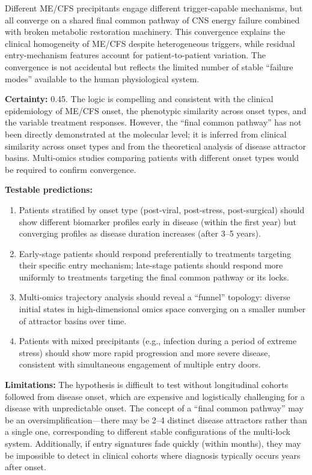 

\begin{hypothesis}
\label{hyp:final-common-pathway}
Different ME/CFS precipitants engage different trigger-capable mechanisms, but all converge on a shared final common pathway of CNS energy failure combined with broken metabolic restoration machinery. This convergence explains the clinical homogeneity of ME/CFS despite heterogeneous triggers, while residual entry-mechanism features account for patient-to-patient variation. The convergence is not accidental but reflects the limited number of stable ``failure modes'' available to the human physiological system.

\textbf{Certainty:} 0.45. The logic is compelling and consistent with the clinical epidemiology of ME/CFS onset, the phenotypic similarity across onset types, and the variable treatment responses. However, the ``final common pathway'' has not been directly demonstrated at the molecular level; it is inferred from clinical similarity across onset types and from the theoretical analysis of disease attractor basins. Multi-omics studies comparing patients with different onset types would be required to confirm convergence.

\textbf{Testable predictions:}
\begin{enumerate}
    \item Patients stratified by onset type (post-viral, post-stress, post-surgical) should show different biomarker profiles early in disease (within the first year) but converging profiles as disease duration increases (after 3--5 years).
    \item Early-stage patients should respond preferentially to treatments targeting their specific entry mechanism; late-stage patients should respond more uniformly to treatments targeting the final common pathway or its locks.
    \item Multi-omics trajectory analysis should reveal a ``funnel'' topology: diverse initial states in high-dimensional omics space converging on a smaller number of attractor basins over time.
    \item Patients with mixed precipitants (e.g., infection during a period of extreme stress) should show more rapid progression and more severe disease, consistent with simultaneous engagement of multiple entry doors.
\end{enumerate}

\textbf{Limitations:} The hypothesis is difficult to test without longitudinal cohorts followed from disease onset, which are expensive and logistically challenging for a disease with unpredictable onset. The concept of a ``final common pathway'' may be an oversimplification---there may be 2--4 distinct disease attractors rather than a single one, corresponding to different stable configurations of the multi-lock system. Additionally, if entry signatures fade quickly (within months), they may be impossible to detect in clinical cohorts where diagnosis typically occurs years after onset.
\end{hypothesis}

